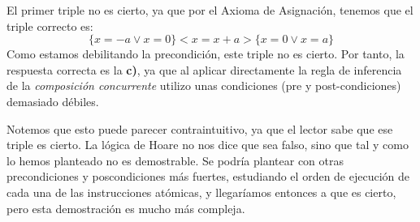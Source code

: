 \begin{ejercicio}
    \begin{comment}
    Estos también son ciertos, por lo que podemos aplicar la regla de la composición concurrente y llegar al siguiente triple:
    \begin{equation*}
        \{x=0 \lor x=a\}\texttt{cobegin}<x=x+a>; <x=x+a>\texttt{coend}; \{x=a\lor x=2a\}
    \end{equation*}

    Por la primera regla de la consecuencia, podemos debilitar la precondición, llegando al siguiente triple:
    \begin{equation*}
        \{x=0\}\texttt{cobegin}<x=x+a>; <x=x+a>\texttt{coend}; \{x=a\lor x=2a\}
    \end{equation*}

    No obstante, la poscondición no se puede debilitar, por lo que la respuesta correcta es la \textbf{b)}, ya que falta incluir en los asertos el valor final de $x$ sea también $\{x=a\}$.
    \end{comment}

    El primer triple no es cierto, ya que por el Axioma de Asignación, tenemos que el triple correcto es:
    \begin{equation*}
        \{x=-a \lor x=0\} <x=x+a> \{x=0 \lor x=a\}
    \end{equation*}
    Como estamos debilitando la precondición, este triple no es cierto. Por tanto, la respuesta correcta es la \textbf{c)}, ya que al aplicar directamente la regla de inferencia de la \textit{composición concurrente} utilizo unas condiciones (pre y post-condiciones) demasiado débiles.
    
    
    \begin{observacion}
        Notemos que esto puede parecer contraintuitivo, ya que el lector sabe que ese triple es cierto. La lógica de Hoare no nos dice que sea falso, sino que tal y como lo hemos planteado no es demostrable. Se podría plantear con otras precondiciones y poscondiciones más fuertes, estudiando el orden de ejecución de cada una de las instrucciones atómicas, y llegaríamos entonces a que es cierto, pero esta demostración es mucho más compleja.
    \end{observacion}
\end{ejercicio}

